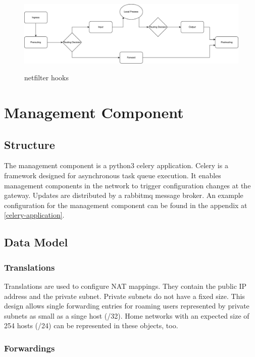 \documentclass{report}
\begin{document}
\begin{figure}[ht]
	\centering
	\includegraphics[width=\textwidth]{../Hooks.pdf}
	\label{Hooks.pdf}
	\caption{netfilter hooks}  
\end{figure}

\chapter{Management Component}\label{management-component}

\section{Structure}\label{structure}

The management component is a python3 celery application. Celery is a
framework designed for asynchronous task queue execution\cite{celery}. It
enables management components in the network to trigger
configuration changes at the gateway. Updates are distributed by a rabbitmq message
broker\cite{rabbit}. An example configuration for the management component
can be found in the appendix at \ref{celery-application}.


\section{Data Model}\label{data-model}

\subsection{Translations}\label{translations}

Translations are used to configure NAT mappings. They contain the public
IP address and the private subnet. Private subnets do not have a fixed size.
This design allows single forwarding entries for roaming users represented by
private subnets as small as a singe host (/32). Home networks with an expected
size of 254 hosts (/24) can be represented in these objects, too.

\subsection{Forwardings}\label{forwardings}
\end{document}
